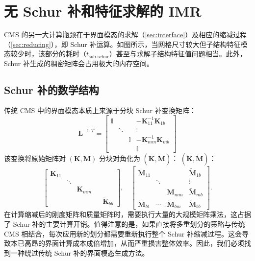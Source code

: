 \section{无 Schur 补和特征求解的 IMR}\label{sec:interface-modes}

CMS 的另一大计算瓶颈在于界面模态的求解（\cref{sec:interface}）及相应的缩减过程（\cref{sec:reducing}），即 Schur 补运算。如图所示，当网格尺寸较大但子结构特征模态较少时，该部分的耗时（$t_{\text{sub-schur}}$）甚至与求解子结构特征值问题相当。此外，Schur 补生成的稠密矩阵会占用极大的内存空间。

\subsection{Schur 补的数学结构}\label{sec:schur-complement}

传统 CMS 中的界面模态本质上来源于分块 Schur 补变换矩阵：
\begin{equation}
  \mathbf{L}^{-1,T} = \begin{bmatrix}
    \mathbb{I} & & & -\mathbf{K}_{11}^{-1} \mathbf{K}_{1b}\\
    &\ddots & & \vdots\\
    &&\mathbb{I}& -\mathbf{K}_{mm}^{-1} \mathbf{K}_{mb}\\
    &&&\mathbb{I}
  \end{bmatrix}
  \label{eq:schur}
\end{equation}
该变换将原始矩阵对 $\left(\mathbf{K}, \mathbf{M} \right)$ 分块对角化为 $\left(\tilde{\mathbf{K}}, \tilde{\mathbf{M}} \right)$：
$\left(\tilde{\mathbf{K}}, \tilde{\mathbf{M}} \right)$：
\begin{equation}
  \begin{bmatrix}
    \mathbf{K}_{11} &&&&\\
    &\ddots&&&\\
    &&\mathbf{K}_{mm}&&\\
    &&&&\tilde{\mathbf{K}}_{bb}
  \end{bmatrix},\quad
  \begin{bmatrix}
    \mathbf{M}_{11} & & & \tilde{\mathbf{M}}_{1b}\\
    &\ddots & & \vdots\\
    & & \mathbf{M}_{mm} & \tilde{\mathbf{M}}_{mb}\\
    \tilde{\mathbf{M}}_{b1} &\cdots &\tilde{\mathbf{M}}_{bm} &\tilde{\mathbf{M}}_{bb}
  \end{bmatrix}.
\end{equation}
在计算缩减后的刚度矩阵和质量矩阵时，需要执行大量的大规模矩阵乘法，这占据了 Schur 补的主要计算开销。值得注意的是，如果直接将多重划分的策略与传统 CMS 相结合，每次应用新的划分都需要重新执行整个 Schur 补缩减过程。这会导致本已高昂的界面计算成本成倍增加，从而严重损害整体效率。因此，我们必须找到一种绕过传统 Schur 补的界面模态生成方法。

